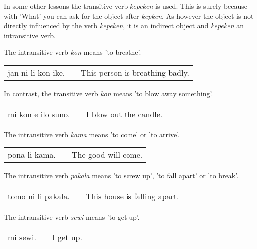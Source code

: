In some other lessons the transitive verb \textit{kepeken} is used.
This is surely because with 'What' you can ask for the object after \textit{kepken}. 
As however the object is not directly influenced by the verb \textit{kepeken}, it is an indirect object and \textit{kepeken} an intransitive verb. 

%
The intransitive verb \textit{kon} means 'to breathe'.

\begin{supertabular}{p{5,5cm}|ll}
jan ni li kon ike. && This person is breathing badly. \\
\end{supertabular}

In contrast, the transitive verb \textit{kon} means 'to blow away something'. 

\begin{supertabular}{p{5,5cm}|ll}
mi kon e ilo suno. && I blow out the candle. \\
\end{supertabular}

%
The intransitive verb \textit{kama} means 'to come' or 'to arrive'.

\begin{supertabular}{p{5,5cm}|ll}
pona li kama. && The good will come. \\
\end{supertabular}

%
The intransitive verb \textit{pakala} means 'to screw up', 'to fall apart' or 'to break'. 

\begin{supertabular}{p{5,5cm}|ll}
tomo ni li pakala. && This house is falling apart. \\	
\end{supertabular}

%
The intransitive verb \textit{sewi} means 'to get up'.

\begin{supertabular}{p{5,5cm}|ll}
mi sewi. &&  I get up. \\	
\end{supertabular}


